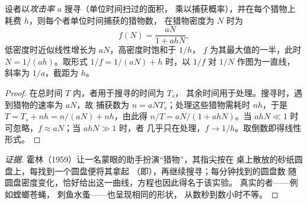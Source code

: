 \begin{theorem}[圆盘方程]\label{thm:b1:species-interactions:holling}
设者以\emph{攻击率} $a$ 搜寻（单位时间扫过的面积，
乘以捕获概率），并在每个猎物上耗费
$h$，则每个者单位时间捕获的猎物数，
在猎物密度为 $N$ 时为
\[
f(N) = \frac{aN}{1 + ahN} ,
\]
低密度时近似线性增长为 $aN$，高密度时饱和于 $1/h$，
$f$ 为其最大值的一半，此时 $N = 1/(ah)$。取形式
$1/f = 1/(aN) + h$ 时，以 $1/f$ 对 $1/N$ 作图为一直线，
斜率为 $1/a$，截距为 $h$。
\end{theorem}
\begin{proof}
在总时间 $T$ 内，者用于搜寻的时间为 $T_s$，
其余时间用于处理。搜寻时，遇到猎物的速率为 $aN$，故
捕获数为 $n = aN T_s$；处理这些猎物需耗时 $nh$，于是 $T = T_s + nh =
n/(aN) + nh$，由此得 $n/T = aN/(1 + ahN)$。当 $ahN \ll 1$ 时
可忽略，$f \approx aN$；当 $ahN \gg 1$ 时，者
几乎只在处理，$f \to 1/h$。取倒数即得线性形式。
\end{proof}
\begin{proof}[证据]
霍林（1959）让一名蒙眼的助手扮演“猎物”，其指尖按在
桌上散放的砂纸圆盘上，每找到一个圆盘便将其拿起
（即），再继续搜寻；每分钟找到的圆盘数
随圆盘密度变化，恰好给出这一曲线，方程也因此得名于该实验。
真实的者——例如螳螂苍蝇，
刺鱼水蚤——也呈现相同的形状，
从数秒到数小时不等。
\end{proof}

